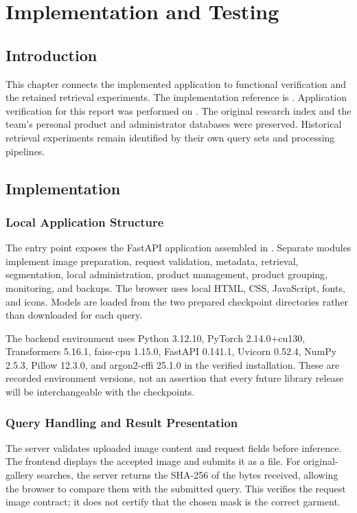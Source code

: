 \chapter{Implementation and Testing}
\label{ch:evaluation}

\section{Introduction}
This chapter connects the implemented application to functional verification and
the retained retrieval experiments. The implementation reference is
\texttt{\ApplicationRelease}. Application verification for this report was performed on
\ReportVerificationDate. The original research index and the team's personal
product and administrator databases were preserved. Historical retrieval
experiments remain identified by their own query sets and processing pipelines.

\section{Implementation}
\subsection{Local Application Structure}
The entry point  exposes the FastAPI application assembled in
. Separate modules implement image preparation,
request validation, metadata, retrieval, segmentation, local administration,
product management, product grouping, monitoring, and backups. The browser uses
local HTML, CSS, JavaScript, fonts, and icons. Models are loaded from the two
prepared checkpoint directories rather than downloaded for each query.

The backend environment uses Python 3.12.10, PyTorch 2.14.0+cu130, Transformers
5.16.1, faiss-cpu 1.15.0, FastAPI 0.141.1, Uvicorn 0.52.4, NumPy 2.5.3, Pillow
12.3.0, and argon2-cffi 25.1.0 in the verified installation. These are recorded
environment versions, not an assertion that every future library release will
be interchangeable with the checkpoints.

\subsection{Query Handling and Result Presentation}
The server validates uploaded image content and request fields before inference.
The frontend displays the accepted image and submits it as a file. For
original-gallery searches, the server returns the SHA-256 of the bytes received,
allowing the browser to compare them with the submitted query. This verifies
the request image contract; it does not certify that the chosen mask is the
correct garment.


